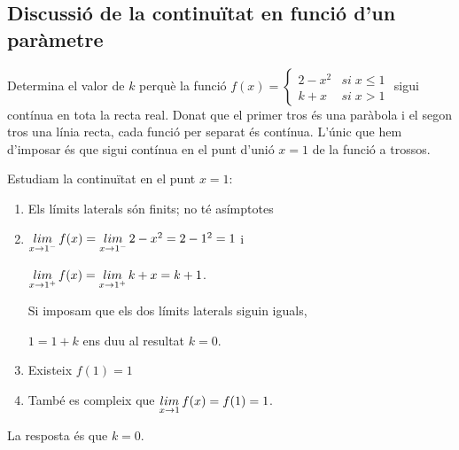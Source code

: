 	\subsection{Discussió de la continuïtat en funció d'un paràmetre}
	
 
	\begin{resolt}[E]{Determina el valor de $k$ perquè la funció $f(x)=\left\{\begin{array}{cc} {2-x^{2} } & {si\; x\le 1} \\ {k+x} & {si\; x>1} \end{array}\right. $ sigui contínua en tota la recta real.
		}
		Donat que el primer tros és una paràbola i el segon tros una línia recta, cada funció per separat és contínua. L'únic que hem d'imposar és que sigui contínua en el punt d'unió $x=1$ de la funció a trossos. \vspace{0.25cm}
		
		Estudiam la continuïtat en el punt $x=1$:
		\begin{enumerate}
			\item Els límits laterals són finits; no té asímptotes \vspace{0.25cm}
			
			\item $\mathop{lim}\limits_{x\to 1^-} f(x)=\mathop{lim}\limits_{x\to 1^-} 2-x^2 = 2-1^2 = 1$ i  \vspace{0.25cm}
			
			$\mathop{lim}\limits_{x\to 1^+} f(x)=\mathop{lim}\limits_{x\to 1^+} k+x = k+1$. \vspace{0.25cm}
			
			Si imposam que els dos límits laterals siguin iguals, \par $1=1+k$ ens duu al resultat $k=0$.
			\vspace{0.25cm}
			
			\item Existeix $f(1)=1$ \vspace{0.25cm}
			\item També es compleix que $\mathop{lim}\limits_{x\to 1} f(x)=f(1)=1$. 
		\end{enumerate}
		La resposta és que $k=0$.
	\end{resolt}
	\vspace{0.5cm}

